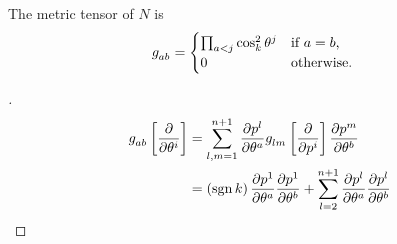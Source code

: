\documentclass[../main.tex]{subfiles}
\begin{document}
\begin{lemma}\label{M:MetricTensor}
    The metric tensor of $N$ is
    \begin{align*}
        \tensor{g}{_a_b} & =
        \begin{cases}
            \prod_{a<j}{\cos_k^2\tensor{\theta}{^j}} & \text{if $a=b$,}  \\
            0                                        & \text{otherwise.} \\
        \end{cases}
    \end{align*}
\end{lemma}
\begin{proof}[]
    \begin{align*}
        \tensor{g}{_a_b}\left[\frac{\partial}{\partial\tensor{\theta}{^i}}\right]
         & = \sum_{l,m=1}^{n+1}{
        \frac{\partial{\tensor{p}{^l}}}{\partial{\tensor{\theta}{^a}}}
        \tensor{g}{_l_m}\left[\frac{\partial}{\partial\tensor{p}{^i}}\right]
        \frac{\partial{\tensor{p}{^m}}}{\partial{\tensor{\theta}{^b}}}
        }                        \\
         & =
        \left(\sign{k}\right)
        \frac{\partial{\tensor{p}{^1}}}{\partial{\tensor{\theta}{^a}}}
        \frac{\partial{\tensor{p}{^1}}}{\partial{\tensor{\theta}{^b}}}
        +
        \sum_{l=2}^{n+1}{
        \frac{\partial{\tensor{p}{^l}}}{\partial{\tensor{\theta}{^a}}}
        \frac{\partial{\tensor{p}{^l}}}{\partial{\tensor{\theta}{^b}}}
        }
    \end{align*}


\end{proof}
\end{document}
